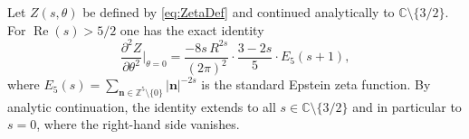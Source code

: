 \begin{theorem}
  \label{thm:zetaLemma}
  Let $Z(s,\theta)$ be defined by \cref{eq:ZetaDef} and continued
  analytically to $\mathbb{C}\setminus\{3/2\}$.  For
  $\operatorname{Re}(s)>5/2$ one has the exact identity
  \begin{equation}
    \label{eq:d2Zformula}
    \frac{\partial^2 Z}{\partial\theta^2}\!\Bigg|_{\theta=0}
      = \frac{-8s\,R^{2s}}{(2\pi)^2}\cdot
        \frac{3-2s}{5}\cdot E_5(s+1),
  \end{equation}
  where $E_5(s)=\sum_{\mathbf{n}\in\mathbb{Z}^5\setminus\{0\}}|\mathbf{n}|^{-2s}$
  is the standard Epstein zeta function.  By analytic continuation,
  the identity extends to all $s\in\mathbb{C}\setminus\{3/2\}$ and in
  particular to $s=0$, where the right-hand side vanishes.
\end{theorem}

